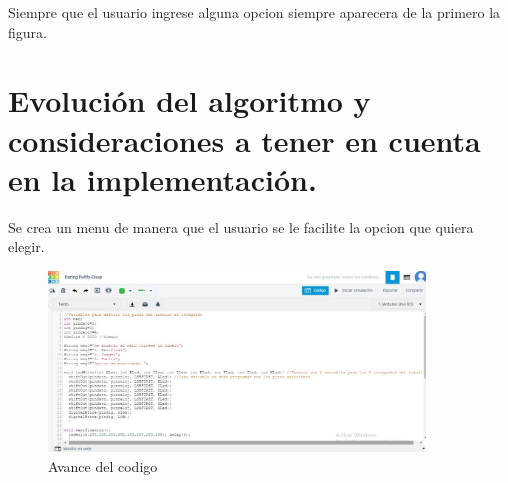 \documentclass{article}
\begin{document}
Siempre que el usuario ingrese alguna opcion siempre aparecera de la primero la figura.

\newpage
\section{Evolución del algoritmo y consideraciones a tener en cuenta en la implementación.}\label{intro}
Se crea un menu de manera que el usuario se le facilite la opcion que quiera elegir.

\begin{figure}[h]
\includegraphics[width=10cm]{Avance 1.jpeg}
\centering
\caption{Avance del codigo}
\label{fig:Avance 1}
\end{figure}
\end{document}
